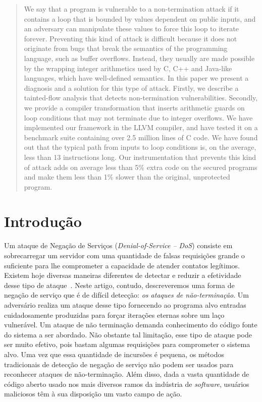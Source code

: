 \documentclass{llncs}
\begin{document}
{
\begin{abstract}
We say that a program is vulnerable to a non-termination attack if it
contains a loop that is bounded by values dependent on public inputs, and
an adversary can manipulate these values to force this loop to iterate forever.
Preventing this kind of attack is difficult because it does not originate
from bugs that break the semantics of the programming
language, such as buffer overflows.
Instead, they usually are made possible by the wrapping integer arithmetics
used by C, C++ and Java-like languages, which have well-defined semantics.
In this paper we present a diagnosis and a solution for this type of attack.
Firstly, we describe a tainted-flow analysis that detects non-termination
vulnerabilities.
Secondly, we provide a compiler transformation that inserts arithmetic guards on
loop conditions that may not terminate due to integer overflows.
We have implemented our framework in the LLVM compiler, and have tested it on
a benchmark suite containing over 2.5 million lines of C code.
We have found out that the typical path from inputs to loop conditions is,
on the average, less than 13 instructions long.
Our instrumentation that prevents this kind of attack adds on average less than
5\% extra code on the secured programs and make them less than 1\% slower than the
original, unprotected program.
\end{abstract}
}

\addtolength{\parskip}{3mm}

\section{Introdução}
\label{sec:int}

Um ataque de Negação de Serviços ({\em Denial-of-Service -- DoS}) consiste
em sobrecarregar um servidor com uma quantidade de falsas requisições grande o
suficiente para lhe comprometer a capacidade de atender contatos
legítimos.
Existem hoje diversas maneiras diferentes de detectar e reduzir a efetividade
desse tipo de ataque~\cite{Moore06}.
Neste artigo, contudo, descreveremos uma forma de negação de serviço que é de
difícil detecção: {\em os ataques de não-terminação}.
Um adversário realiza um ataque desse tipo fornecendo ao programa alvo entradas
cuidadosamente produzidas para forçar iterações eternas sobre um laço
vulnerável.
Um ataque de não terminação demanda conhecimento do código fonte do sistema
a ser abordado.
Não obstante tal limitação, esse tipo de ataque pode ser muito efetivo,
pois bastam algumas requisições para comprometer o sistema alvo.
Uma vez que essa quantidade de incursões é pequena, os métodos tradicionais
de detecção de negação de serviço não podem ser usados para reconhecer ataques
de não-terminação.
Além disso, dada a vasta quantidade de código aberto usado nos mais diversos
ramos da indústria de {\em software}, usuários maliciosos têm à sua
disposição um vasto campo de ação.
\end{document}
